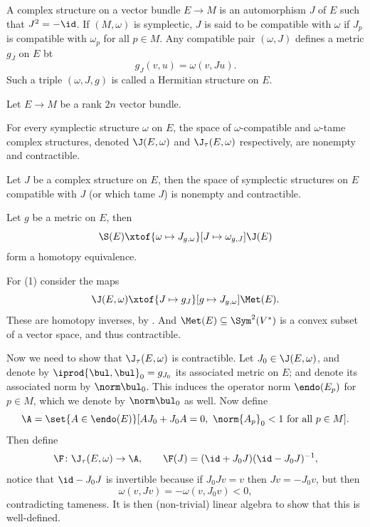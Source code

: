     A {\emphcolor complex structure} on a vector bundle $E\to M$ is an automorphism $J$ of $E$ such that $J^2=-\id$.
    If $(M,\omega)$ is symplectic, $J$ is said to be {\emphcolor compatible} with $\omega$ if $J_p$ is compatible with $\omega_p$ for all $p\in M$.
    Any compatible pair $(\omega,J)$ defines a metric $g_J$ on $E$ bt
    $$ g_J(v,u) = \omega(v,Ju) . $$
    Such a triple $(\omega,J,g)$ is called a {\emphcolor Hermitian structure} on $E$.

\edefn

\bprop[name={homotopsympbund}]

    Let $E\to M$ be a rank $2n$ vector bundle.
    \benum
        \item For every symplectic structure $\omega$ on $E$, the space of $\omega$-compatible and $\omega$-tame complex structures, denoted $\J(E,\omega)$ and $\J_\tau(E,\omega)$ respectively,
        are nonempty and contractible.
        \item Let $J$ be a complex structure on $E$, then the space of symplectic structures on $E$ compatible with $J$ (or which tame $J$) is nonempty and contractible.
        \item Let $g$ be a metric on $E$, then
        $$ \S(E) \xtof{\omega\mapsto J_{g,\omega}}[J\mapsto\omega_{g,J}] \J(E) $$
        form a homotopy equivalence.
    \eenum

\eprop

\bproof

    For (1) consider the maps
    $$ \J(E,\omega) \xtof{J\mapsto g_J}[g\mapsto J_{g,\omega}] \Met(E) . $$
    These are homotopy inverses, by .
    And $\Met(E)\subseteq\Sym^2(V^*)$ is a convex subset of a vector space, and thus contractible.

    Now we need to show that $\J_\tau(E,\omega)$ is contractible.
    Let $J_0\in\J(E,\omega)$, and denote by $\iprod{\bul,\bul}_0=g_{J_0}$ its associated metric on $E$; and denote its associated norm by $\norm\bul_0$.
    This induces the operator norm $\endo(E_p)$ for $p\in M$, which we denote by $\norm\bul_0$ as well.
    Now define
    $$ \A = \set{A\in\endo(E)}[AJ_0+J_0A=0,\ \norm{A_p}_0<1\hbox{ for all $p\in M$}] . $$
    Then define
    $$ \F\colon\J_\tau(E,\omega) \to \A,\qquad \F(J) = (\id+J_0J)(\id-J_0J)^{-1} , $$
    notice that $\id-J_0J$ is invertible because if $J_0Jv=v$ then $Jv=-J_0v$, but then
    $$ \omega(v,Jv) = -\omega(v,J_0v) < 0 , $$
    contradicting tameness.
    It is then (non-trivial) linear algebra to show that this is well-defined.

